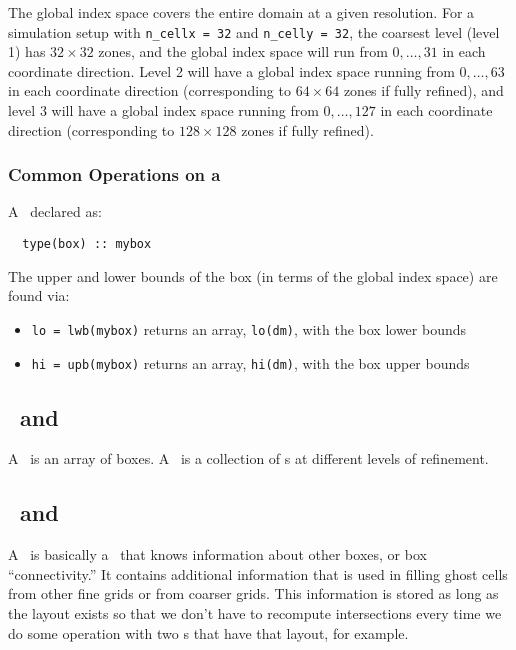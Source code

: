 The global index space covers the entire domain at a given resolution.
For a simulation setup with {\tt n\_cellx = 32} and {\tt n\_celly =
  32}, the coarsest level (level 1) has $32 \times 32$ zones, and the
global index space will run from $0, \ldots, 31$ in each coordinate
direction.  Level 2 will have a global index space running from $0,
\ldots, 63$ in each coordinate direction (corresponding to $64 \times
64$ zones if fully refined), and level 3 will have a global index
space running from $0, \ldots, 127$ in each coordinate direction
(corresponding to $128\times 128$ zones if fully refined).


\subsubsection{Common Operations on a \boxtype}

A \boxtype\ declared as:
\begin{verbatim}
  type(box) :: mybox
\end{verbatim}
%
The upper and lower bounds of the box (in terms of the global
index space) are found via:
\begin{itemize}

\item {\tt lo = lwb(mybox)} returns an array, {\tt lo(dm)}, with
     the box lower bounds

\item {\tt hi = upb(mybox)} returns an array, {\tt hi(dm)}, with
     the box upper bounds

\end{itemize}




\subsection{\boxarray\ and \mlboxarray}

A \boxarray\ is an array of boxes.  A \mlboxarray\ is a collection of
\boxarray s at different levels of refinement.

\subsection{\layout\ and \mllayout}

A \layout\ is basically a \boxarray\ that knows information about other
boxes, or box ``connectivity.''  It contains additional information
that is used in filling ghost cells from other fine grids or from
coarser grids.  This information is stored as long as the layout
exists so that we don't have to recompute intersections every time we
do some operation with two \multifab s that have that layout, for
example.


